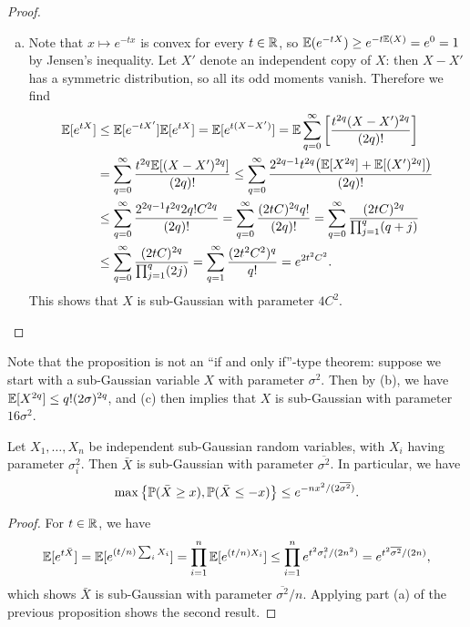 \begin{proof}
\begin{enumerate}[(a)]
\item Note that $x \mapsto e^{-tx}$ is convex for every $t \in \mathbb R$, so $\mathbb E(e^{-tX}) \geq e^{-t \mathbb E(X)} = e^{0} = 1$ by Jensen's inequality. Let $X'$ denote an independent copy of $X$: then $X - X'$ has a symmetric distribution, so all its odd moments vanish. Therefore we find
\begin{align*}
	\mathbb E[e^{tX}] &\leq \mathbb E[e^{-tX'}] \mathbb E[e^{tX}] = \mathbb E[e^{t(X - X')}] = \mathbb E \sum_{q=0}^\infty \qty[\frac{t^{2q} (X - X')^{2q}}{(2q)!}] \\
	&= \sum_{q=0}^\infty \frac{t^{2q} \mathbb E[(X - X')^{2q}]}{(2q)!} \leq \sum_{q=0}^\infty \frac{2^{2q-1} t^{2q} \qty(\mathbb E[X^{2q}] + \mathbb E[(X')^{2q}])}{(2q)!} \\
	&\leq \sum_{q=0}^\infty  \frac{2^{2q - 1}t^{2q} 2 q! C^{2q}}{(2q)!} =\sum_{q=0}^\infty  \frac{(2tC)^{2q}q!}{(2q)!} = \sum_{q=0}^\infty \frac{(2tC)^{2q}}{\prod_{j=1}^q (q+j)} \\
	&\leq \sum_{q=0}^\infty \frac{(2tC)^{2q}}{\prod_{j=1}^q (2j)} = \sum_{q=1}^\infty \frac{(2t^2C^2)^q}{q!} = e^{2t^2C^2}.
\end{align*}
This shows that $X$ is sub-Gaussian with parameter $4C^2$. 
    \end{enumerate}
\end{proof}

Note that the proposition is not an ``if and only if''-type theorem: suppose we start with a sub-Gaussian variable $X$ with parameter $\sigma^2$. Then by (b), we have $\mathbb E[X^{2q}] \leq q!(2\sigma)^{2q}$, and (c) then implies that $X$ is sub-Gaussian with parameter $16\sigma^2$. 

\begin{theorem}
	Let $X_1, \dotsc, X_n$ be independent sub-Gaussian random variables, with $X_i$ having parameter $\sigma_i^2$. Then $\bar X$ is sub-Gaussian with parameter $\overline{\sigma^2}$. In particular, we have
	\[
	\max\qty{\mathbb P(\bar X \geq x), \mathbb P(\bar X \leq -x)} \leq e^{-nx^2/(2\overline{\sigma^2})}.
	\]
\end{theorem}

\begin{proof}
	For $t \in \mathbb R$, we have
	\[
	\mathbb E[e^{t\bar X}] = \mathbb E[e^{(t/n)\sum_i X_i}] = \prod_{i=1}^n \mathbb E[e^{(t/n)X_i}] \leq \prod_{i=1}^n e^{t^2\sigma_i^2/(2n^2)} = e^{t^2\overline{\sigma^2}/(2n)},
	\]
	which shows $\bar X$ is sub-Gaussian with parameter $\overline{\sigma^2}/n$. Applying part (a) of the previous proposition shows the second result. 
\end{proof}

